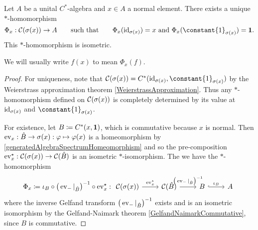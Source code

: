 \begin{theorem} \label{continuousFunctionalCalculus}
Let $A$ be a unital $C^*$-algebra and $x\in A$ a normal element. There exists a unique $*$-homomorphism
\[ \Phi_x: \cont(\spec(x))\to A \qquad \text{such that} \qquad \text{$\Phi_x(\id_{\spec(x)}) = x$ and $\Phi_x(\constant{1}_{\spec(x)}) = \vec{1}$.} \]
This $*$-homomorphism is isometric.
\end{theorem}
We will usually write $f(x)$ to mean $\Phi_x(f)$.
\begin{proof}
For uniqueness, note that $\cont(\spec(x)) = C^*(\id_{\spec(x)}, \constant{1}_{\spec(x)})$ by the Weierstrass approximation theorem \ref{WeierstrassApproximation}. Thus any $*$-homomorphism defined on $\operatorname{\mathcal{C}}(\sigma(x))$ is completely determined by its value at $\operatorname{id}_{\sigma(x)}$ and $\constant{1}_{\spec(x)}$.

For existence, let $B \coloneqq C^*(x,\boldsymbol{\mathrm{1}})$, which is commutative because $x$ is normal. Then $\operatorname{ev}_x: \hat{B}\to \sigma(x): \varphi\mapsto \varphi(x)$ is a homeomorphism by \ref{generatedAlgebraSpectrumHomeomorphism} and so the pre-composition $\operatorname{ev}_x^\star: \mathcal{C}(\sigma(x))\to \mathcal{C}(\hat{B})$ is an isometric $*$-isomorphism. The we have the $*$-homomorphism
\[ \Phi_x \defeq \iota_B\circ\big(\evalMap_{-}|_{\hat{B}}\big)^{-1}\circ \evalMap_x^\star: \begin{tikzcd} \mathcal{C}(\sigma(x)) \ar[r, "{\evalMap_x^\star}"] & \mathcal{C}(\hat{B}) \ar[r, "\big(\evalMap_{-}|_{\hat{B}}\big)^{-1}"] & B \ar[r , hook, "\iota_B"] & A \end{tikzcd} \]
where the inverse Gelfand transform $\big(\operatorname{ev}_{-}|_{\hat{B}}\big)^{-1}$ exists and is an isometric isomorphism by the Gelfand-Naimark theorem \ref{GelfandNaimarkCommutative}, since $B$ is commutative.


\end{proof}
